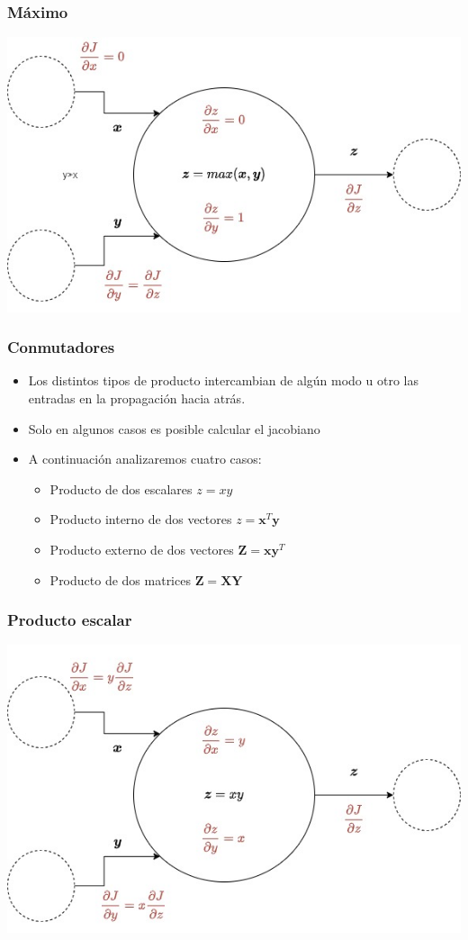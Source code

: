 \documentclass{beamer}
\begin{document}
\begin{frame}
\frametitle{Máximo}
\includegraphics[scale=0.35]{im25}
\end{frame}
\begin{frame}
\frametitle{Conmutadores}
\begin{itemize}
\item Los distintos tipos de producto intercambian de algún modo u otro las entradas en la propagación hacia atrás. 
\item Solo en algunos casos es posible calcular el jacobiano
\item A continuación analizaremos cuatro casos:
\begin{itemize}
\item Producto de dos escalares $z=xy$
\item Producto interno de dos vectores $z= \boldsymbol{x}^T\boldsymbol{y}$
\item Producto externo de dos vectores $\boldsymbol{Z}= \boldsymbol{x}\boldsymbol{y}^T$
\item Producto de dos matrices $\boldsymbol{Z}= \boldsymbol{X}\boldsymbol{Y}$
\end{itemize}
\end{itemize}
\end{frame}
\begin{frame}
\frametitle{Producto escalar}
\includegraphics[scale=0.35]{im26}
\end{frame}
\end{document}
